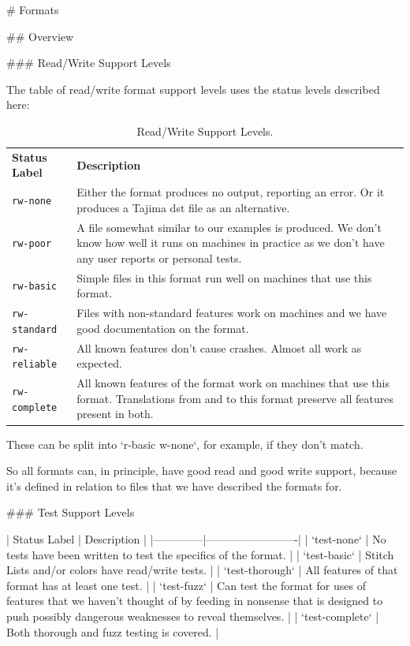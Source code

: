 # Formats

## Overview

### Read/Write Support Levels

The table of read/write format support levels uses the status levels described here:

\begin{longtable}{p{4cm} p{8cm}}
\caption{Read/Write Support Levels.}
\label{tab:read-write-support} \\
\textbf{Status Label} &
\textbf{Description} \\

\texttt{rw-none} &
Either the format produces no output, reporting an error. Or it produces a
Tajima dst file as an alternative. \\

\texttt{rw-poor} &
A file somewhat similar to our examples is produced. We don't know how well
it runs on machines in practice as we don't have any user reports or personal
tests. \\

\texttt{rw-basic} &
Simple files in this format run well on machines that use this format. \\

\texttt{rw-standard} &
Files with non-standard features work on machines and we have good documentation
on the format. \\

\texttt{rw-reliable} &
All known features don't cause crashes. Almost all work as expected. \\

\texttt{rw-complete} &
All known features of the format work on machines that use this format.
Translations from and to this format preserve all features present in both.
\end{longtable}

These can be split into `r-basic w-none`, for example, if they don't match.

So all formats can, in principle, have good read and good write support, because it's defined in relation to files that we have described the formats for.

### Test Support Levels

| Status Label | Description             |
|--------------|-------------------------|
| `test-none` | No tests have been written to test the specifics of the format. |
| `test-basic` | Stitch Lists and/or colors have read/write tests. |
| `test-thorough` | All features of that format has at least one test. |
| `test-fuzz` | Can test the format for uses of features that we haven't thought of by feeding in nonsense that is designed to push possibly dangerous weaknesses to reveal themselves. |
| `test-complete` | Both thorough and fuzz testing is covered. |


